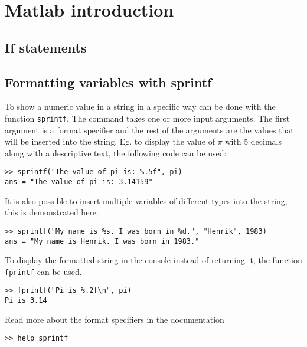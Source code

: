 \section{Matlab introduction}


\subsection{If statements}





\subsection{Formatting variables with sprintf}

To show a numeric value in a string in a specific way can be 
done with the function \verb!sprintf!.
The command takes one or more input arguments.
The first argument is a format specifier and the rest
of the arguments are the values that will be inserted 
into the string.
Eg. to display the value of $\pi$ with 5 decimals
along with a descriptive text, the following code 
can be used:
\begin{lstlisting}
>> sprintf("The value of pi is: %.5f", pi)
ans = "The value of pi is: 3.14159"
\end{lstlisting}
It is also possible to insert multiple variables
of different types into the string, this is demonstrated 
here.
\begin{lstlisting}
>> sprintf("My name is %s. I was born in %d.", "Henrik", 1983)
ans = "My name is Henrik. I was born in 1983."
\end{lstlisting}
To display the formatted string in the console
instead of returning it, the function
\verb!fprintf! can be used.
\begin{lstlisting}
>> fprintf("Pi is %.2f\n", pi)
Pi is 3.14
\end{lstlisting}
Read more about the format specifiers in the documentation
\begin{lstlisting}
>> help sprintf
\end{lstlisting}




